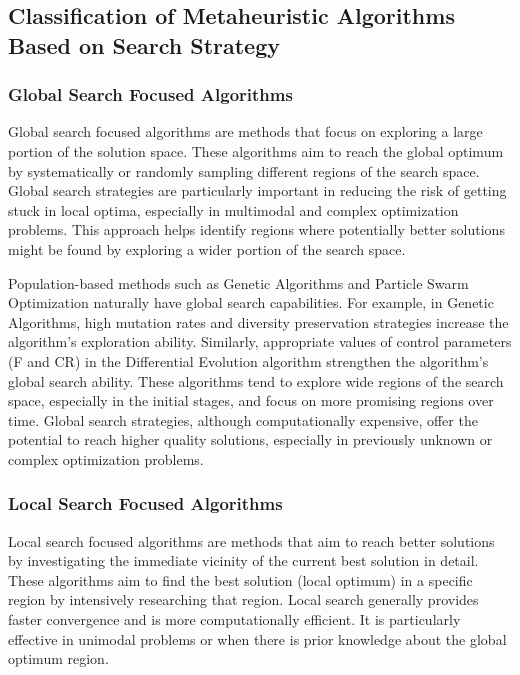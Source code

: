 \subsection{Classification of Metaheuristic Algorithms Based on Search Strategy}

\subsubsection{Global Search Focused Algorithms}

Global search focused algorithms are methods that focus on exploring a large portion of the solution space. These algorithms aim to reach the global optimum by systematically or randomly sampling different regions of the search space. Global search strategies are particularly important in reducing the risk of getting stuck in local optima, especially in multimodal and complex optimization problems. This approach helps identify regions where potentially better solutions might be found by exploring a wider portion of the search space.

Population-based methods such as Genetic Algorithms and Particle Swarm Optimization naturally have global search capabilities. For example, in Genetic Algorithms, high mutation rates and diversity preservation strategies increase the algorithm's exploration ability. Similarly, appropriate values of control parameters (F and CR) in the Differential Evolution algorithm strengthen the algorithm's global search ability. These algorithms tend to explore wide regions of the search space, especially in the initial stages, and focus on more promising regions over time. Global search strategies, although computationally expensive, offer the potential to reach higher quality solutions, especially in previously unknown or complex optimization problems.

\subsubsection{Local Search Focused Algorithms}

Local search focused algorithms are methods that aim to reach better solutions by investigating the immediate vicinity of the current best solution in detail. These algorithms aim to find the best solution (local optimum) in a specific region by intensively researching that region. Local search generally provides faster convergence and is more computationally efficient. It is particularly effective in unimodal problems or when there is prior knowledge about the global optimum region.

